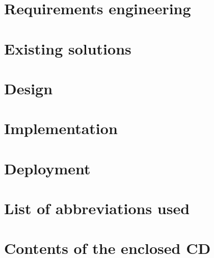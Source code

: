 \documentclass[thesis=B,english]{FITthesis}[2019/12/23]
\begin{document}
%
%

\chapter{Requirements engineering}
\label{chap:requirementsengineering}


\chapter{Existing solutions}
\label{chap:existingsolutions}


\chapter{Design}
\label{chap:design}



\chapter{Implementation}
\label{chap:implementation}


\chapter{Deployment}


\begin{conclusion}
	
\end{conclusion}

%
%


\appendix

\chapter{List of abbreviations used}
\begin{description}
	
\end{description}

\chapter{Contents of the enclosed CD}
\end{document}
